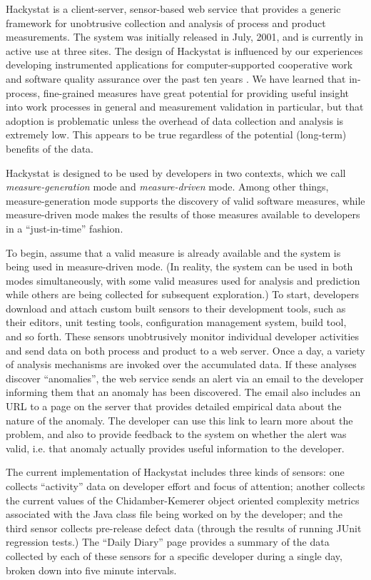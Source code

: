 Hackystat is a client-server, sensor-based web service that provides a
generic framework for unobtrusive collection and analysis of process and
product measurements. The system was initially released in July, 2001, and
is currently in active use at three sites. The design of Hackystat is
influenced by our experiences developing instrumented applications for
computer-supported cooperative work and software quality assurance over the
past ten years
\cite{csdl-93-09,csdl-93-22,csdl-97-02,csdl-98-13,csdl2-00-03}.  We have
learned that in-process, fine-grained measures have great potential for
providing useful insight into work processes in general and measurement
validation in particular, but that adoption is problematic unless the
overhead of data collection and analysis is extremely low. This appears to
be true regardless of the potential (long-term) benefits of the data.

Hackystat is designed to be used by developers in two contexts, which we
call {\em measure-generation} mode and {\em measure-driven} mode.  Among
other things, measure-generation mode supports the discovery of valid
software measures, while measure-driven mode makes the results of those
measures available to developers in a ``just-in-time'' fashion.

To begin, assume that a valid measure is already available and the system
is being used in measure-driven mode. (In reality, the system can be used
in both modes simultaneously, with some valid measures used for analysis and
prediction while others are being collected for subsequent exploration.)  To start, developers
download and attach custom built sensors to their development tools, such
as their editors, unit testing tools, configuration management system,
build tool, and so forth.  These sensors unobtrusively monitor individual
developer activities and send data on both process and product to a web
server. Once a day, a variety of analysis mechanisms are invoked over the
accumulated data.  If these analyses discover ``anomalies'', the web
service sends an alert via an email to the developer informing them that an
anomaly has been discovered. The email also includes an URL to a page on the
server that provides detailed empirical data about the nature of the
anomaly. The developer can use this link to learn more about the problem,
and also to provide feedback to the system on whether the alert was valid,
i.e. that anomaly actually provides useful information to the developer.

The current implementation of Hackystat includes three kinds of sensors:
one collects ``activity'' data on developer effort and focus of attention;
another collects the current values of the Chidamber-Kemerer object
oriented complexity metrics associated with the Java class file being
worked on by the developer; and the third sensor collects pre-release
defect data (through the results of running JUnit regression tests.) The
``Daily Diary'' page provides a summary of the data collected by each of
these sensors for a specific developer during a single day, broken down
into five minute intervals.

